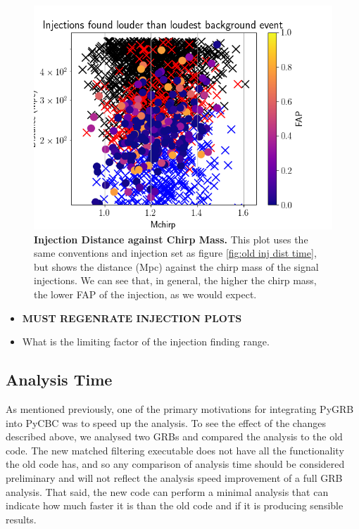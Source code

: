 \documentclass[11pt]{cuthesis}
\begin{document}
\begin{figure} %
\begin{center}
\includegraphics[width=0.8\linewidth]{found_missed_injections_dist_mchirp.png}
\end{center}
\caption{\textbf{Injection Distance against Chirp Mass.} This plot uses the same conventions and injection set as figure \ref{fig:old inj dist time}, but shows the distance (Mpc) against the chirp mass of the signal injections. We can see that, in general, the higher the chirp mass, the lower FAP of the injection, as we would expect.}  
\label{fig:old inj dist mchirp}
\end{figure}

\begin{itemize}
\item \textbf{MUST REGENRATE INJECTION PLOTS}
\item What is the limiting factor of the injection finding range.
\end{itemize}

\subsection{Analysis Time} \label{sec:speed gains}
As mentioned previously, one of the primary motivations for integrating PyGRB into PyCBC was to speed up the analysis. To see the effect of the changes described above, we analysed two GRBs and compared the analysis to the old code. The new matched filtering executable does not have all the functionality the old code has, and so any comparison of analysis time should be considered preliminary and will not reflect the analysis speed improvement of a full GRB analysis. That said, the new code can perform a minimal analysis that can indicate how much faster it is than the old code and if it is producing sensible results. 
\end{document}
